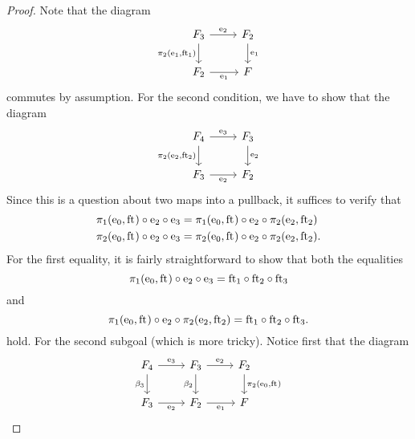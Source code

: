 \begin{proof}
Note that the diagram
\begin{equation*}
\begin{tikzcd}
\stesysf_3
  \ar{d}[swap]{\pullbackpr{2}{\efamext}{\eft[1]}}
  \ar{r}{\eext{2}}
  & 
\stesysf_2 
  \ar{d}{\efamext} 
  \\
\stesysf_2 
  \ar{r}[swap]{\efamext} 
  &
\stesysf
\end{tikzcd}
\end{equation*}
commutes by assumption. For the second condition, we have to show that the
diagram
\begin{equation*}
\begin{tikzcd}
\stesysf_4
  \ar{d}[swap]{\pullbackpr{2}{\eext{2}}{\eft[2]}}
  \ar{r}{\eext{3}}
  & 
\stesysf_3
  \ar{d}{\eext{2}} 
  \\
\stesysf_3
  \ar{r}[swap]{\eext{2}} 
  &
\stesysf_2
\end{tikzcd}
\end{equation*}
Since this is a question about two maps into a pullback, it suffices to verify
that
\begin{align*}
\pullbackpr{1}{\ectxext}{\eft}\circ\eext{2}\circ\eext{3}
  & =
\pullbackpr{1}{\ectxext}{\eft}\circ\eext{2}\circ\pullbackpr{2}{\eext{2}}{\eft[2]}
  \\
\pullbackpr{2}{\ectxext}{\eft}\circ\eext{2}\circ\eext{3}
  & =
\pullbackpr{2}{\ectxext}{\eft}\circ\eext{2}\circ\pullbackpr{2}{\eext{2}}{\eft[2]}.
\end{align*}
For the first equality, it is fairly straightforward to show that both the
equalities
\begin{equation*}
\pullbackpr{1}{\ectxext}{\eft}\circ\eext{2}\circ\eext{3}
  =
\eft[1]\circ\eft[2]\circ\eft[3]
\end{equation*}
and
\begin{equation*}
\pullbackpr{1}{\ectxext}{\eft}\circ\eext{2}\circ\pullbackpr{2}{\eext{2}}{\eft[2]}
  =
\eft[1]\circ\eft[2]\circ\eft[3].
\end{equation*}
hold. For the second subgoal (which is more tricky). Notice first that the
diagram
\begin{equation*}
\begin{tikzcd}
\stesysf_4
  \ar{r}{\eext{3}}
  \ar{d}[swap]{\beta_3}
  &
\stesysf_3
  \ar{r}{\eext{2}}
  \ar{d}[swap]{\beta_2}
  &
\stesysf_2
  \ar{d}{\pullbackpr{2}{\ectxext}{\eft}}
  \\
\stesysf_3
  \ar{r}[swap]{\eext{2}}
  &
\stesysf_2
  \ar{r}[swap]{\efamext}
  &
\stesysf
\end{tikzcd}

\end{equation*}
\end{proof}
